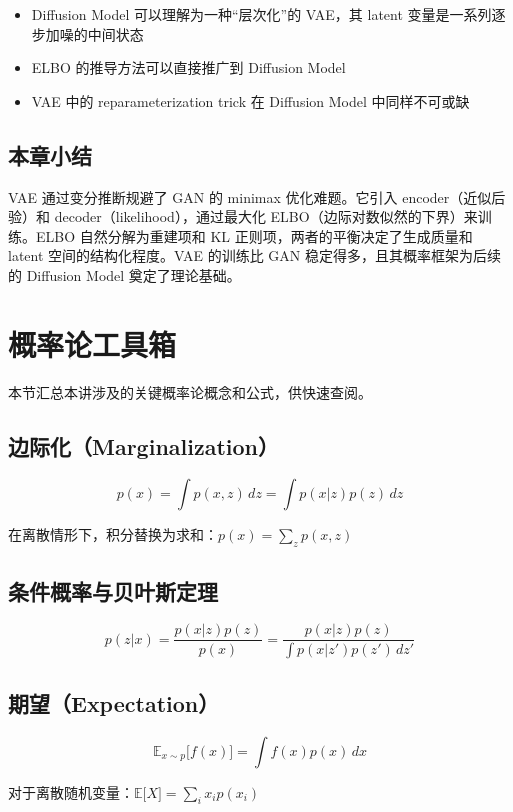 \documentclass[a4paper]{article}
\begin{document}
\begin{itemize}
    \item Diffusion Model 可以理解为一种``层次化''的 VAE，其 latent 变量是一系列逐步加噪的中间状态
    \item ELBO 的推导方法可以直接推广到 Diffusion Model
    \item VAE 中的 reparameterization trick 在 Diffusion Model 中同样不可或缺
\end{itemize}

\subsection{本章小结}

VAE 通过变分推断规避了 GAN 的 minimax 优化难题。它引入 encoder（近似后验）和 decoder（likelihood），通过最大化 ELBO（边际对数似然的下界）来训练。ELBO 自然分解为重建项和 KL 正则项，两者的平衡决定了生成质量和 latent 空间的结构化程度。VAE 的训练比 GAN 稳定得多，且其概率框架为后续的 Diffusion Model 奠定了理论基础。

\newpage
\section{概率论工具箱}

本节汇总本讲涉及的关键概率论概念和公式，供快速查阅。

\subsection{边际化（Marginalization）}

$$p(x) = \int p(x, z) \, dz = \int p(x|z) p(z) \, dz$$

在离散情形下，积分替换为求和：$p(x) = \sum_z p(x, z)$

\subsection{条件概率与贝叶斯定理}

$$p(z|x) = \frac{p(x|z) p(z)}{p(x)} = \frac{p(x|z) p(z)}{\int p(x|z') p(z') \, dz'}$$

\subsection{期望（Expectation）}

$$\mathbb{E}_{x \sim p}{[}f(x){]} = \int f(x) p(x) \, dx$$

对于离散随机变量：$\mathbb{E}{[}X{]} = \sum_i x_i p(x_i)$
\end{document}
